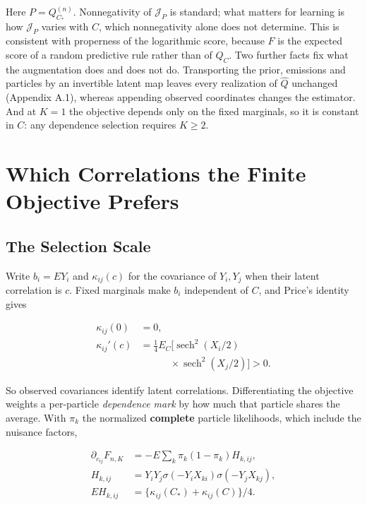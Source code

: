 \documentclass{article}
\begin{document}
Here \(P=Q_{C_*}^{(n)}\). Nonnegativity of \(\mathcal J_P\) is standard;
what matters for learning is how \(\mathcal J_P\) varies with \(C\),
which nonnegativity alone does not determine. This is consistent with
properness of the logarithmic score, because \(F\) is the expected score
of a random predictive rule rather than of \(Q_C\). Two further facts
fix what the augmentation does and does not do. Transporting the prior,
emissions and particles by an invertible latent map leaves every
realization of \(\widehat Q\) unchanged (Appendix A.1), whereas
appending observed coordinates changes the estimator. And at \(K=1\) the
objective depends only on the fixed marginals, so it is constant in
\(C\): any dependence selection requires \(K\ge2\).

\section{Which Correlations the Finite Objective
Prefers}\label{which-correlations-the-finite-objective-prefers}

\subsection{The Selection Scale}\label{the-selection-scale}

Write \(b_i=EY_i\) and \(\kappa_{ij}(c)\) for the covariance of
\(Y_i,Y_j\) when their latent correlation is \(c\). Fixed marginals make
\(b_i\) independent of \(C\), and Price's identity \citep{price1958}
gives

\[
\begin{aligned}
\kappa_{ij}(0)&=0,\\
\kappa_{ij}'(c)&=\tfrac14 E_C[\operatorname{sech}^2(X_i/2)\\
&\qquad\quad{}\times\operatorname{sech}^2(X_j/2)]>0.
\end{aligned}
\tag{5}
\]

So observed covariances identify latent correlations. Differentiating
the objective weights a per-particle \emph{dependence mark} by how much
that particle shares the average. With \(\pi_k\) the normalized
\textbf{complete} particle likelihoods, which include the nuisance
factors,

\[
\begin{aligned}
\partial_{c_{ij}}F_{n,K}
&=-E\sum_k\pi_k(1-\pi_k)H_{k,ij},\\
H_{k,ij}&=Y_iY_j\sigma(-Y_iX_{ki})\sigma(-Y_jX_{kj}),\\
EH_{k,ij}&=\{\kappa_{ij}(C_*)+\kappa_{ij}(C)\}/4.
\end{aligned}
\tag{6}
\]
\end{document}
